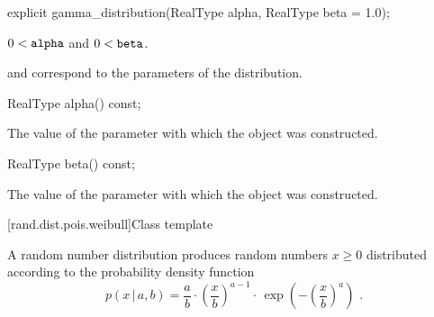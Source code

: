 %
\begin{itemdecl}
explicit gamma_distribution(RealType alpha, RealType beta = 1.0);
\end{itemdecl}

\begin{itemdescr}
\pnum
\expects
$0 < \texttt{alpha}$ and $0 < \texttt{beta}$.

\pnum
\remarks
{} and 
correspond to the parameters of the distribution.
\end{itemdescr}

%
\begin{itemdecl}
RealType alpha() const;
\end{itemdecl}

\begin{itemdescr}
\pnum
\returns
The value of the  parameter
 with which the object was constructed.
\end{itemdescr}

%
\begin{itemdecl}
RealType beta() const;
\end{itemdecl}

\begin{itemdescr}
\pnum
\returns
The value of the  parameter
 with which the object was constructed.
\end{itemdescr}


[rand.dist.pois.weibull]{Class template }%
%
%

\pnum
A  random number distribution
produces random numbers $x \geq 0$
distributed according to
the probability density function%
%
%
\[ p(x\,|\,a,b) = \frac{a}{b}
     \cdot \left(\frac{x}{b}\right)^{a-1}
     \cdot \, \exp\left( -\left(\frac{x}{b}\right)^a\right)
     \text{ .} \]

